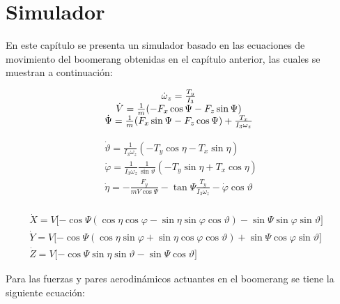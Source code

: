 \section{Simulador}

	En este capítulo se presenta un simulador basado en las ecuaciones de movimiento del boomerang obtenidas en el capítulo anterior, las cuales se muestran a continuación:

		\begin{equation}
		\begin{matrix}
		\dot{\omega}_{z}=\frac{T_{y}}{{I}_{3}}\\
		\dot{V}=\frac{1}{m}(-{F}_{x}\cos{\Psi}-{F}_{z}\sin{\Psi})\\
		\dot{\Psi}=\frac{1}{m }({F}_{x}\sin{\Psi-{F}_{z}\cos{\Psi}})+\frac{{T}_{x}}{{I}_{3}{\omega}_{z}} \\
		\end{matrix}\\
		\label{ec61}
		\end{equation}

		\begin{equation}
		\begin{matrix}
		 {\dot{\vartheta}}=\frac{1}{{I}_{3}{\omega}_{z}}(-{T}_{y}\cos{\eta}-{T}_{x}\sin{\eta})\\
		 \dot{\varphi}=\frac{1}{{I}_{3}{\omega}_{z}}\frac{1}{\sin{\vartheta}}(-{T}_{y}\sin {\eta}+{T}_{x}\cos{\eta})\\
		 \dot{\eta}=-\frac{{F}_{y}}{mV\cos{\Psi}}-\tan{\Psi}\frac{T_{y}}{{I}_{3}{\omega}_{z}}-\dot{\varphi} \cos{\vartheta} \\
		\end{matrix}
		\label{ec62}
		\end{equation}

		\begin{equation}
		\begin{matrix}
		\dot{X} = V[{-\cos{\Psi}(\cos{\eta}\cos{\varphi}-\sin{\eta}\sin{\varphi}\cos{\vartheta})-\sin{\Psi}\sin{\varphi}\sin{\vartheta}]}\quad\\
	    \dot{Y}=V[{-\cos{\Psi}\left(\cos{\eta}\sin{\varphi}+\sin{\eta}\cos{\varphi}\cos{\vartheta}\right)+\sin{\Psi}\cos{\varphi}\sin{\vartheta}]}\\
	    \dot{Z}=V[{-\cos{\Psi\sin{\eta}\sin{\vartheta}-\sin{\Psi}\cos{\vartheta}}]}
		\end{matrix}
		\label{ec63}
		\end{equation}

	Para las fuerzas y pares aerodinámicos actuantes en el boomerang se tiene la siguiente ecuación:

